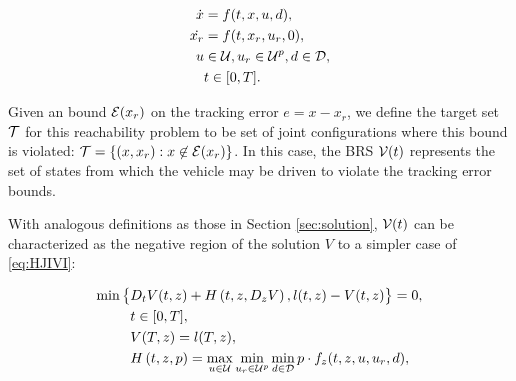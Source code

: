 \begin{equation}
\label{eq:jdyn} %
\begin{aligned}
\dot{x} &= f(t, x, u, d), \\
\dot{x_r} &=f(t,x_r,u_r,0),\\
u &\in \cset, u_r\in\cset^p, d \in \dset, \\
&t \in [0, T].
\end{aligned}
\end{equation}

Given an bound $\mathcal{E}(x_r)$ on the tracking error $e=x-x_r$, we define the target set $\mathcal{T}$ for this reachability problem to be set of joint configurations where this bound is violated: $\mathcal{T} = \{(x, x_r): x\not\in\mathcal{E}(x_r)\}$. In this case, the BRS $\mathcal{V}(t)$ represents the set of states from which the vehicle may be driven to violate the tracking error bounds. 




With analogous definitions as those in Section \ref{sec:solution}, $\mathcal{V}(t)$ can be characterized as the negative region of the solution $V$ to a simpler case of \eqref{eq:HJIVI}:

\begin{equation}
\label{eq:HJIVI_track}
\begin{aligned}
\min\big\{&D_t V(t, z) + H\left(t, z, D_z V\right), l(t,z) - V(t, z)\big\}= 0,\\&  t\in[0,T],\\
&V(T, z) = l(T, z),\\
&H\left(t, z, p\right) = \max_{u \in \mathcal{U}} \min_{u_r \in\mathcal{U}^p} \min_{d \in \mathcal{D}} p \cdot f_z(t,z,u,u_r,d),
\end{aligned}
\end{equation}

